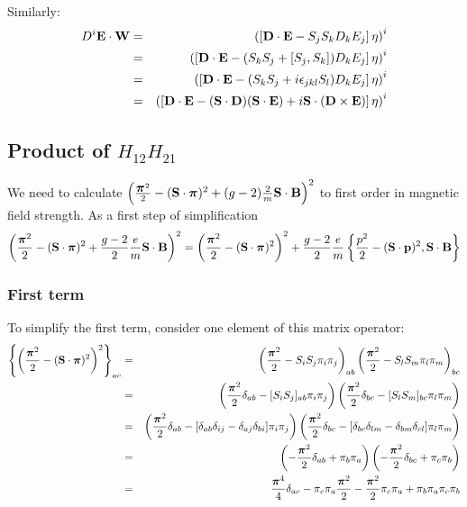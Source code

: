 Similarly:
\begin{eqnarray*}
 D^i \mathbf{E} \cdot \mathbf{W}
	&=& \left( \left[\mathbf{D} \cdot \mathbf{E}  - S_j S_k D_k E_j\right] \mathbf{\eta} \right)^i		\\
	&=& \left( \left[\mathbf{D} \cdot \mathbf{E}  -  (S_k S_j + [S_j, S_k]) D_k E_j \right] \mathbf{\eta} \right)^i		\\
	&=& \left( \left[\mathbf{D} \cdot \mathbf{E}  -  (S_k S_j +i\epsilon_{jkl} S_l) D_k E_j \right] \mathbf{\eta} \right)^i		\\
	&=& \left( \left[\mathbf{D} \cdot \mathbf{E}  - (\mathbf{S} \cdot \mathbf{D})(\mathbf{S} \cdot \mathbf{E}) + i \mathbf{S} \cdot (\mathbf{D} \times \mathbf{E})\right] \mathbf{\eta} \right)^i		\\
\end{eqnarray*}	

\subsection*{Product of $H_{12}H_{21}$}
We need to calculate $\left(  \frac {\mbox{\boldmath$ \pi $}^2} {2} -  (\mathbf{S} \cdot \mbox{\boldmath$ \pi $})^2 + (g-2)\frac{2}{m} \mathbf{S} \cdot \mathbf{B} \right )^2 $ to first order in magnetic field strength.  As a first step of simplification
\[
\left(  \frac {\mbox{\boldmath$ \pi $}^2} {2} -  (\mathbf{S} \cdot \mbox{\boldmath$ \pi $})^2 + \frac{g-2}{2}\frac{e}{m} \mathbf{S} \cdot \mathbf{B} \right )^2 
	=	\left(  \frac {\mbox{\boldmath$ \pi $}^2} {2} -  (\mathbf{S} \cdot \mbox{\boldmath$ \pi $})^2  \right )^2 
		 +\frac{g-2}{2}\frac{e}{m} \left \{ \frac{p^2}{2} - (\mathbf{S} \cdot \mathbf{p})^2, \mathbf{S} \cdot \mathbf{B} \right \}
\]	

\subsubsection*{First term}
To simplify the first term, consider one element of this matrix operator:
\begin{eqnarray*}
\left\{ \left(  \frac {\mbox{\boldmath$ \pi $}^2} {2} -  (\mathbf{S} \cdot \mbox{\boldmath$ \pi $})^2   \right )^2  \right \} _{ac}
	&=& 	\left (  \frac {\mbox{\boldmath$ \pi $}^2} {2} - S_i S_j \pi_i \pi_j \right)_{ab} 
				\left (  \frac {\mbox{\boldmath$ \pi $}^2} {2} - S_l S_m \pi_l \pi_m \right)_{bc}\\
	&=& 	\left (  \frac {\mbox{\boldmath$ \pi $}^2} {2}\delta_{ab} - [S_i S_j]_{ab} \pi_i \pi_j \right)
				\left (  \frac {\mbox{\boldmath$ \pi $}^2} {2}\delta_{bc} - [S_l S_m]_{bc} \pi_l \pi_m \right)\\
	&=& 	\left (  \frac {\mbox{\boldmath$ \pi $}^2} {2}\delta_{ab} - [\delta_{ab}\delta_{ij} - \delta_{aj}\delta_{bi}] \pi_i \pi_j \right)
				\left (  \frac {\mbox{\boldmath$ \pi $}^2} {2}\delta_{bc} -  [\delta_{bc}\delta_{lm} - \delta_{bm}\delta_{cl}] \pi_l \pi_m \right)\\
	&=& 	\left (  -\frac {\mbox{\boldmath$ \pi $}^2} {2}\delta_{ab} + \pi_b \pi_a \right)
				\left (  -\frac {\mbox{\boldmath$ \pi $}^2} {2}\delta_{bc} + \pi_c \pi_b \right) \\
	&=&  	\frac{ \mbox{\boldmath$ \pi $}^4 } {4} \delta_{ac}
				- \pi_c \pi_a \frac{\mbox{\boldmath$ \pi $}^2}{2}
				- \frac{\mbox{\boldmath$ \pi $}^2}{2} \pi_c \pi_a
				+ \pi_b \pi_a \pi_c \pi_b \\
\end{eqnarray*}

